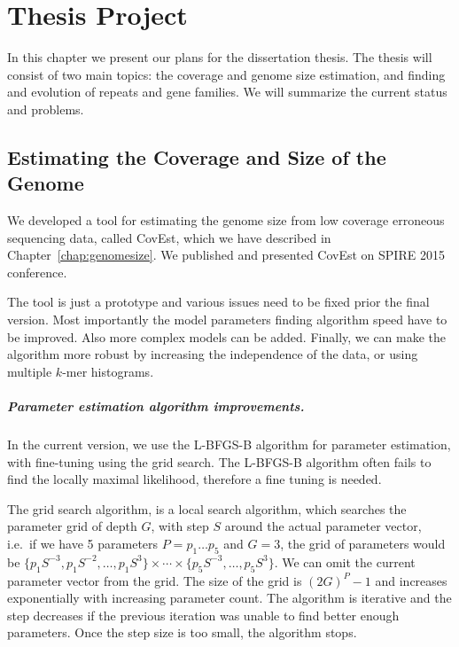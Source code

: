 \chapter{Thesis Project}

In this chapter we present our plans for the dissertation thesis. The thesis will consist of two main topics:
the coverage and genome size estimation, and finding and evolution of repeats and gene families.
We will summarize the current status and problems.

\section{Estimating the Coverage and Size of the Genome}

We developed a tool for estimating the genome size from low coverage erroneous sequencing data, called CovEst, which we have described in Chapter~\ref{chap:genomesize}. We published and presented CovEst on SPIRE 2015 conference\cite{covest}.

The tool is just a prototype and various issues need to be fixed prior the final version. Most importantly the model parameters finding algorithm speed have to be improved. Also more complex models can be added. Finally, we can make the algorithm more robust by increasing the independence of the data, or using multiple $k$-mer histograms.

\paragraph{Parameter estimation algorithm improvements.}
In the current version, we use the L-BFGS-B\cite{l-bfgs-b} algorithm for parameter estimation, with fine-tuning using the grid search.
The L-BFGS-B algorithm often fails to find the locally maximal likelihood, therefore a fine tuning is needed.

The grid search algorithm, is a local search algorithm, which searches the parameter grid of depth $G$, with step $S$ around the actual parameter vector, i.e.\ if we have 5 parameters $P = p_1\dots p_5$ and $G = 3$, the grid of parameters would be $\{p_1 S^{-3}, p_1 S^{-2}, \dots, p_1 S^3\} \times \cdots \times \{p_5 S^{-3}, \dots, p_5 S^3\}$. We can omit the current parameter vector from the grid. The size of the grid is ${(2G)}^P - 1$ and increases exponentially with increasing parameter count. The algorithm is iterative and the step decreases if the previous iteration was unable to find better enough parameters. Once the step size is too small, the algorithm stops.

